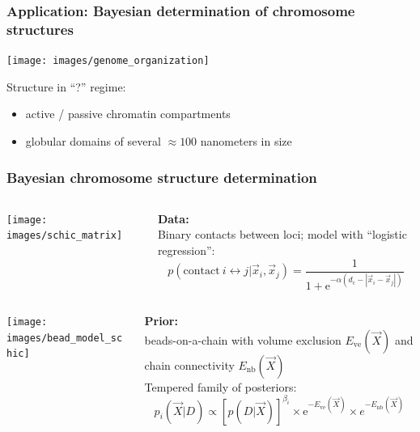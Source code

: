 \documentclass[t,aspectratio=169]{beamer}
\begin{document}
\begin{frame}
  \frametitle{Application: Bayesian determination of chromosome structures}
  \begin{center}
    \texttt{[image: images/genome\_organization]}
  \end{center}
  Structure in ``?'' regime:
  \begin{itemize}
  \item active / passive chromatin compartments
  \item globular domains of several $\approx 100$ nanometers in size
  \end{itemize}
\end{frame}

\begin{frame}
  \frametitle{Bayesian chromosome structure determination}
  \begin{columns}
    \begin{column}[T]{0.28\textwidth}
      \texttt{[image: images/schic\_matrix]}
    \end{column}
    \begin{column}[T]{0.7\textwidth}
      \textbf{Data:}\\
      Binary contacts between loci; model with ``logistic regression'':
      \begin{equation*}
        p(\mathrm{contact\ } i \leftrightarrow j|\vec x_i, \vec x_j) = \frac{1}{1+\mathrm e^{-\alpha (d_{\mathrm{c}} - |\vec x_i - \vec x_j|)}}
      \end{equation*}
    \end{column}
  \end{columns}
  \vfill
  \begin{columns}
    \begin{column}[T]{0.28\textwidth}
      \texttt{[image: images/bead\_model\_schic]}
    \end{column}
    \begin{column}[T]{0.7\textwidth}
      \textbf{Prior:}\\
      beads-on-a-chain with volume exclusion $E_\mathrm{ve}(\vec X)$ and chain connectivity $E_\mathrm{nb}(\vec X)$\\
      \bigskip
      Tempered family of posteriors:\\
      \begin{equation*}
        p_i(\vec X|D) \propto [p(D|\vec X)]^{\beta_i} \times \mathrm e^{-E_\mathrm{ve}(\vec X)} \times e^{-E_\mathrm{nb}(\vec X)}
      \end{equation*}
    \end{column}
  \end{columns}
\end{frame}
\end{document}
